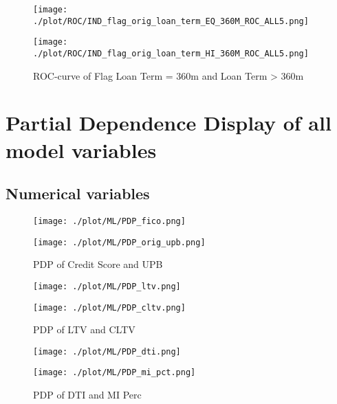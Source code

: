 \begin{figure}[H]
\begin{minipage}{.5\textwidth}
	\centering
	\texttt{[image: ./plot/ROC/IND\_flag\_orig\_loan\_term\_EQ\_360M\_ROC\_ALL5.png]}
\end{minipage}%
\begin{minipage}{.5\textwidth}
	\centering
	\texttt{[image: ./plot/ROC/IND\_flag\_orig\_loan\_term\_HI\_360M\_ROC\_ALL5.png]}
\end{minipage}
    \caption{ROC-curve of Flag Loan Term = 360m and Loan Term > 360m}
\end{figure}

\section{Partial Dependence Display of all model variables}
\label{sec:PDP_all}

\subsection{Numerical variables}

\begin{figure}[H]
\begin{minipage}{.5\textwidth}
	\centering
	\texttt{[image: ./plot/ML/PDP\_fico.png]}
\end{minipage}%
\begin{minipage}{.5\textwidth}
	\centering
	\texttt{[image: ./plot/ML/PDP\_orig\_upb.png]}
\end{minipage}
    \caption{PDP of Credit Score and UPB}
\end{figure}

\begin{figure}[H]
\begin{minipage}{.5\textwidth}
	\centering
	\texttt{[image: ./plot/ML/PDP\_ltv.png]}
\end{minipage}%
\begin{minipage}{.5\textwidth}
	\centering
	\texttt{[image: ./plot/ML/PDP\_cltv.png]}
\end{minipage}
    \caption{PDP of LTV and CLTV}
\end{figure}

\begin{figure}[H]
\begin{minipage}{.5\textwidth}
	\centering
	\texttt{[image: ./plot/ML/PDP\_dti.png]}
\end{minipage}%
\begin{minipage}{.5\textwidth}
	\centering
	\texttt{[image: ./plot/ML/PDP\_mi\_pct.png]}
\end{minipage}
    \caption{PDP of DTI and MI Perc}
\end{figure}

